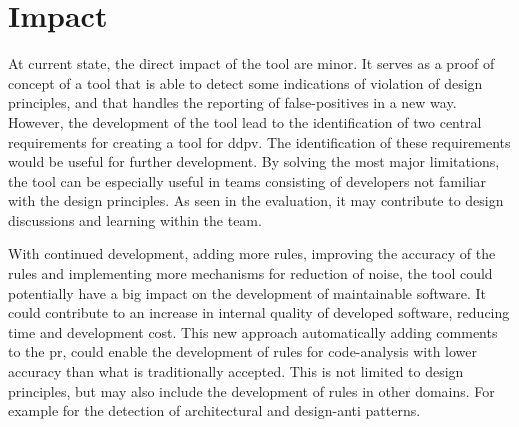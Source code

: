 \documentclass[pdftex,10pt,b5paper,twoside]{report}
\begin{document}



\section{Impact}

At current state, the direct impact of the tool are minor. It serves as a proof of concept of a tool that is able to detect some indications of violation of design principles, and that handles the reporting of false-positives in a new way. However, the development of the tool lead to the identification of two central requirements for creating a tool for \gls{ddpv}. The identification of these requirements would be useful for further development. By solving the most major limitations, the tool can be especially useful in teams consisting of developers not familiar with the design principles. As seen in the evaluation, it may contribute to design discussions and learning within the team.

With continued development, adding more rules, improving the accuracy of the rules and implementing more mechanisms for reduction of noise, the tool could potentially have a big impact on the development of maintainable software. It could contribute to an increase in internal quality of developed software, reducing time and development cost. This new approach automatically adding comments to the \gls{pr}, could enable the development of rules for code-analysis with lower accuracy than what is traditionally accepted. This is not limited to design principles, but may also include the development of rules in other domains. For example for the detection of architectural and design-anti patterns.
\end{document}

